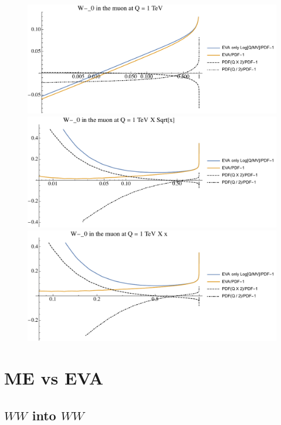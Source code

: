 \documentclass[a4paper,11pt]{article}
\begin{document}
\begin{figure}[!t]
\includegraphics[width=0.46\linewidth]{Notebooks/PlotPDFs/ratios/1TeV/W-_0_Q.pdf}
\includegraphics[width=0.46\linewidth]{Notebooks/PlotPDFs/ratios/1TeV/W-_0_Qsqrtx.pdf}
\includegraphics[width=0.46\linewidth]{Notebooks/PlotPDFs/ratios/1TeV/W-_0_Qx.pdf}
\end{figure}

\clearpage



\section{ME vs EVA}

\subsection{$WW$ into $WW$}
\end{document}
